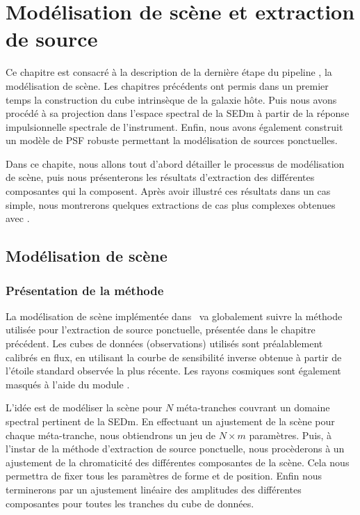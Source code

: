 \documentclass[../main/main.tex]{subfiles}
\begin{document}
\setcounter{chapter}{7}
\chapter{Modélisation de scène et extraction de source}\label{ch:res}
\minitoc
\vspace{2cm}
Ce chapitre est consacré à la description de la dernière étape du pipeline \hypergal, la
modélisation de scène. Les chapitres précédents ont permis dans un
premier temps la
construction du cube intrinsèque de la galaxie hôte. Puis nous avons
procédé à sa projection dans
l'espace spectral de la SEDm à partir de la réponse impulsionnelle
spectrale de l'instrument. Enfin, nous avons également construit un modèle
de PSF robuste permettant la modélisation de sources ponctuelles.

Dans ce chapite, nous allons tout d'abord détailler le processus de
modélisation de scène, puis nous présenterons les résultats d'extraction des
différentes composantes qui la composent. Après avoir illustré ces
résultats dans un cas simple, nous montrerons quelques extractions de cas
plus complexes obtenues avec \hypergal.
\newpage

\section{Modélisation de scène}

\subsection{Présentation de la méthode}

La modélisation de scène implémentée dans \hypergal\ va globalement
suivre la méthode utilisée pour l'extraction de source ponctuelle,
présentée dans le chapitre précédent. Les cubes de données (observations) utilisés sont
préalablement calibrés en flux, en utilisant la courbe de sensibilité
inverse obtenue à partir de l'étoile standard observée la plus
récente. Les rayons cosmiques sont également masqués à l'aide du module
 \citep{Kimcontsep}.

L'idée est de modéliser la scène pour $N$ méta-tranches couvrant un
domaine spectral pertinent de la SEDm. En effectuant un ajustement de la
scène pour chaque méta-tranche, nous obtiendrons un jeu de
$N\times m$ paramètres. Puis, à l'instar de la méthode d'extraction de source
ponctuelle, nous procèderons à un ajustement de la chromaticité des
différentes composantes de la scène. Cela nous permettra de fixer tous
les paramètres de forme et de position. Enfin nous terminerons par un ajustement linéaire
des amplitudes des différentes composantes pour toutes les tranches du cube de données.
\end{document}
